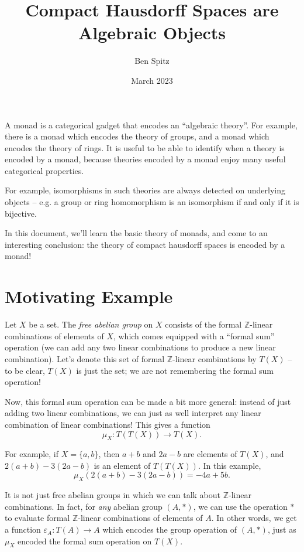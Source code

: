 \documentclass{article}
\title{Compact Hausdorff Spaces are Algebraic Objects}
\author{Ben Spitz}
\date{March 2023}
\theoremstyle{definition}
\begin{document}
\maketitle

A monad is a categorical gadget that encodes an ``algebraic theory''. For example, there is a monad which encodes the theory of groups, and a monad which encodes the theory of rings. It is useful to be able to identify when a theory is encoded by a monad, because theories encoded by a monad enjoy many useful categorical properties.

For example, isomorphisms in such theories are always detected on underlying objects -- e.g. a group or ring homomorphism is an isomorphism if and only if it is bijective.

In this document, we'll learn the basic theory of monads, and come to an interesting conclusion: the theory of compact hausdorff spaces is encoded by a monad!

\section{Motivating Example}

Let $X$ be a set. The \emph{free abelian group} on $X$ consists of the formal $\mathbb{Z}$-linear combinations of elements of $X$, which comes equipped with a ``formal sum'' operation (we can add any two linear combinations to produce a new linear combination). Let's denote this set of formal $\mathbb{Z}$-linear combinations by $T(X)$ -- to be clear, $T(X)$ is just the set; we are not remembering the formal sum operation!

Now, this formal sum operation can be made a bit more general: instead of just adding two linear combinations, we can just as well interpret any linear combination of linear combinations! This gives a function
\[\mu_X : T(T(X)) \to T(X).\]

For example, if $X = \{a,b\}$, then $a+b$ and $2a-b$ are elements of $T(X)$, and $2(a+b)-3(2a-b)$ is an element of $T(T(X))$. In this example, $$\mu_X(2(a+b)-3(2a-b)) = -4a+5b.$$

It is not just free abelian groups in which we can talk about $\mathbb{Z}$-linear combinations. In fact, for \emph{any} abelian group $(A,*)$, we can use the operation $*$ to evaluate formal $\mathbb{Z}$-linear combinations of elements of $A$. In other words, we get a function $\varepsilon_A : T(A) \to A$ which encodes the group operation of $(A,*)$, just as $\mu_X$ encoded the formal sum operation on $T(X)$.
\end{document}
